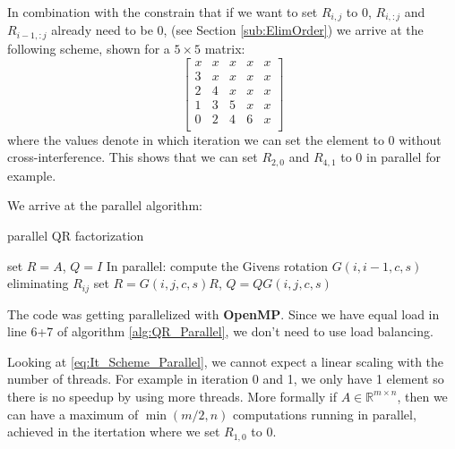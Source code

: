 \documentclass[a4paper]{scrartcl}
\begin{document}
            
            In combination with the constrain that if we want to set
            $R_{i,j}$ to 0, $R_{i, :j}$ and $R_{i-1, :j}$ already need to be
            0, (see Section \ref{sub:ElimOrder}) we arrive at the following
            scheme, shown for a $5\times 5$ matrix:
            \begin{equation}\label{eq:It_Scheme_Parallel}
                \begin{bmatrix}
                    x & x & x & x & x \\
                    3 & x & x & x & x \\
                    2 & 4 & x & x & x \\
                    1 & 3 & 5 & x & x \\
                    0 & 2 & 4 & 6 & x \\
                \end{bmatrix}
            \end{equation}
            where the values denote in which iteration we can set the
            element to 0 without cross-interference. This shows that we can
            set $R_{2,0}$ and $R_{4,1}$ to 0 in parallel for example.

            We arrive at the parallel algorithm:
            \begin{algorithm}[H]
                \caption{parallel QR factorization }\label{alg:QR_Parallel}
                \begin{algorithmic}[1]
                        \State set $R=A$, $Q=I$
                            \State In parallel:
                                \State compute the Givens rotation $G(i,i-1,c,s)$ eliminating $R_{ij}$ 
                                \State set $R=G(i,j,c,s) R$, $Q = Q G(i,j,c,s)$
                            \EndFor
                        \EndFor
                    \EndProcedure
                \end{algorithmic}
            \end{algorithm}

            The code was getting parallelized with \textbf{OpenMP}. Since we
            have equal load in line 6+7 of algorithm \ref{alg:QR_Parallel},
            we don't need to use load balancing.

            Looking at \ref{eq:It_Scheme_Parallel}, we cannot expect a linear scaling
            with the number of threads. For example in iteration 0 and 1, we
            only have 1 element so there is no speedup by using more
            threads. More formally if $A \in \mathbb{R}^{m\times n}$, then
            we can have a maximum of $\min(m/2, n)$ computations running in
            parallel, achieved in the itertation where we set $R_{1,0}$ to
            0.
\end{document}
